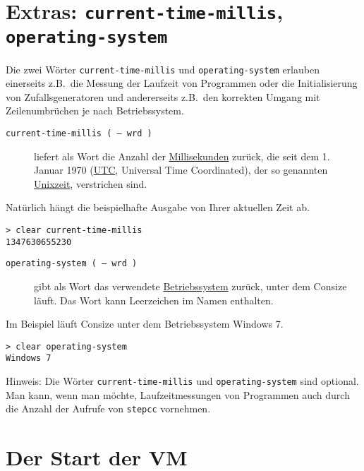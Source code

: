 \section{Extras: \texttt{current-time-millis}, \texttt{operating-system}}
\label{Sec:Core.Extras}

Die zwei Wörter \verb|current-time-millis| und \verb|operating-system| erlauben einerseits z.B.\ die Messung der Laufzeit von Programmen oder die Initialisierung von Zufallsgeneratoren und andererseits z.B.\ den korrekten Umgang mit Zeilenumbrüchen je nach Betriebssystem.

\begin{description}
\item[\texttt{current-time-millis ( -- wrd )}] liefert als Wort die Anzahl der \href{http://de.wikipedia.org/wiki/Millisekunde#Abgeleitete\_Ma.C3.9Feinheiten}{Millisekunden} zurück, die seit dem 1. Januar 1970 (\href{http://de.wikipedia.org/wiki/UTC}{UTC}, Universal Time Coordinated), der so genannten \href{http://de.wikipedia.org/wiki/Unixzeit}{Unixzeit}, verstrichen sind.
\end{description}

Natürlich hängt die beispielhafte Ausgabe von Ihrer aktuellen Zeit ab.

\begin{verbatim}
> clear current-time-millis
1347630655230
\end{verbatim}

\begin{description}
\item[\texttt{operating-system ( -- wrd )}] gibt als Wort das verwendete \href{http://de.wikipedia.org/wiki/Betriebssystem}{Betriebssystem} zurück, unter dem Consize läuft. Das Wort kann Leerzeichen im Namen enthalten.
\end{description}

Im Beispiel läuft Consize unter dem Betriebssystem Windows 7.

\begin{verbatim}
> clear operating-system
Windows 7
\end{verbatim}

Hinweis: Die Wörter \verb|current-time-millis| und \verb|operating-system| sind optional. Man kann, wenn man möchte, Laufzeitmessungen von Programmen auch durch die Anzahl der Aufrufe von \verb|stepcc| vornehmen.

\section{Der Start der VM}

